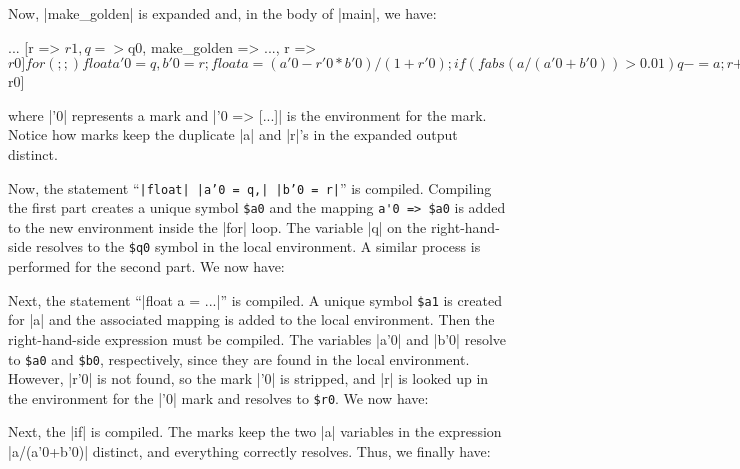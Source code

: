 Now, |make_golden| is expanded and, in the body of |main|, we have:
\begin{code}
  ...
  [r => $r1, q => $q0, make_golden => ..., r => $r0]
  for (;;) { float a'0 = q, b'0 = r;
             float a = (a'0 - r'0*b'0)/(1 + r'0);
             if (fabs(a/(a'0+b'0)) > 0.01) 
               {q -= a; r += a;} 
             else break; }
  '0 => [r => $r0]
\end{code}
where |'0| represents a mark and |'0 => [...]| is the environment for
the mark.  Notice how marks keep the duplicate |a| and |r|'s in
the expanded output distinct.

Now, the statement ``{\tt |float| |a'0 = q,| |b'0 = r|}'' is compiled.
Compiling the first part creates a unique symbol \verb/$a0/ and the
mapping \verb/a'0 => $a0/ is added to the new environment inside the
|for| loop.    The variable |q| on the
right-hand-side resolves to the \verb/$q0/ symbol in the local
environment.  A similar process is performed for the second part.  We
now have:

Next, the statement ``|float a = ...|'' is compiled.  A unique
symbol \verb/$a1/ is created for |a| and the associated mapping is
added to the local environment.  Then the right-hand-side expression must be
compiled.  The variables |a'0| and |b'0| resolve to \verb/$a0/ and
\verb/$b0/, respectively, since they are found in the local environment.
However, |r'0| is not found, so the mark |'0| is stripped, and |r|
is looked up in the environment for the |'0| mark and resolves to
\verb/$r0/. We now have:

Next, the |if| is compiled.  The marks keep the two |a| variables in
the expression |a/(a'0+b'0)| distinct, and everything correctly
resolves.  Thus, we finally have:

